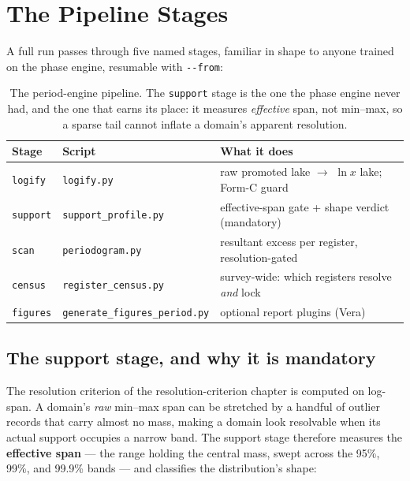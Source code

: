 \documentclass[11pt, letterpaper, openany]{book}
\begin{document}
\section{The Pipeline Stages}

A full run passes through five named stages, familiar in shape to anyone trained on the phase
engine, resumable with \texttt{-{}-from}:

\begin{table}[H]
\centering
\small
\begin{tabular}{@{}lll@{}}
\toprule
\textbf{Stage} & \textbf{Script} & \textbf{What it does} \\
\midrule
\texttt{logify}  & \texttt{logify.py} & raw promoted lake $\to$ $\ln x$ lake; Form-C guard \\
\texttt{support} & \texttt{support\_profile.py} & effective-span gate + shape verdict (mandatory) \\
\texttt{scan}    & \texttt{periodogram.py} & resultant excess per register, resolution-gated \\
\texttt{census}  & \texttt{register\_census.py} & survey-wide: which registers resolve \emph{and} lock \\
\texttt{figures} & \texttt{generate\_figures\_period.py} & optional report plugins (Vera) \\
\bottomrule
\end{tabular}
\caption{The period-engine pipeline. The \texttt{support} stage is the one the phase engine never
had, and the one that earns its place: it measures \emph{effective} span, not min--max, so a sparse
tail cannot inflate a domain's apparent resolution.}
\end{table}

\subsection{The support stage, and why it is mandatory}

The resolution criterion of the resolution-criterion chapter is computed on log-span. A domain's
\emph{raw} min--max span can be stretched by a handful of outlier records that carry almost no mass,
making a domain look resolvable when its actual support occupies a narrow band. The support stage
therefore measures the \textbf{effective span} --- the range holding the central mass, swept across
the 95\%, 99\%, and 99.9\% bands --- and classifies the distribution's shape:
\end{document}
